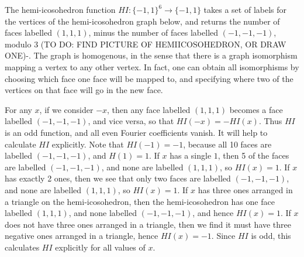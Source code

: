 \begin{example}
    The hemi-icosohedron function $HI: \{ -1, 1 \}^6 \to \{ -1, 1 \}$ takes a set of labels for the vertices of the hemi-icosohedron graph below, and returns the number of faces labelled $(1,1,1)$, minus the number of faces labelled $(-1,-1,-1)$, modulo 3 (TO DO: FIND PICTURE OF HEMIICOSOHEDRON, OR DRAW ONE)-. The graph is homogenous, in the sense that there is a graph isomorphism mapping a vertex to any other vertex. In fact, one can obtain all isomorphisms by choosing which face one face will be mapped to, and specifying where two of the vertices on that face will go in the new face.

    For any $x$, if we consider $-x$, then any face labelled $(1,1,1)$ becomes a face labelled $(-1,-1,-1)$, and vice versa, so that $HI(-x) = - HI(x)$. Thus $HI$ is an odd function, and all even Fourier coefficients vanish. It will help to calculate $HI$ explicitly. Note that $HI(-1) = -1$, because all 10 faces are labelled $(-1,-1,-1)$, and $H(1) = 1$. If $x$ has a single $1$, then 5 of the faces are labelled $(-1,-1,-1)$, and none are labelled $(1,1,1)$, so $HI(x) = 1$. If $x$ has exactly 2 ones, then we see that only two faces are labelled $(-1,-1,-1)$, and none are labelled $(1,1,1)$, so $HI(x) = 1$. If $x$ has three ones arranged in a triangle on the hemi-icosohedron, then the hemi-icosohedron has one face labelled $(1,1,1)$, and none labelled $(-1,-1,-1)$, and hence $HI(x) = 1$. If $x$ does not have three ones arranged in a triangle, then we find it must have three negative ones arranged in a triangle, hence $HI(x) = -1$. Since $HI$ is odd, this calculates $HI$ explicitly for all values of $x$.


\end{example}
